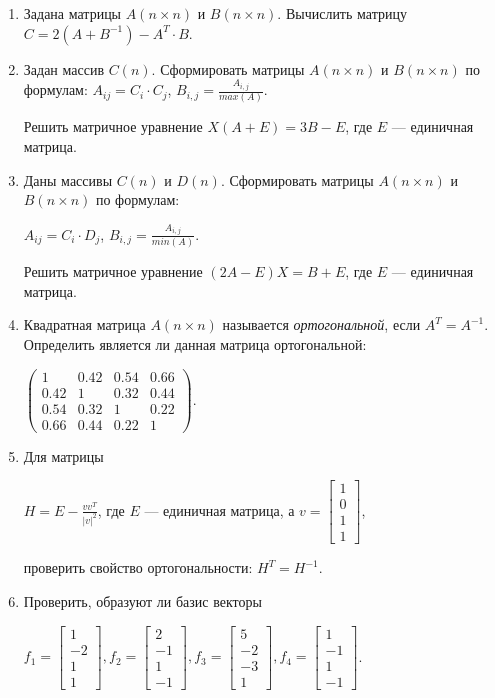 \begin{enumerate}
\item Задана матрицы $A(n\times n)$ и $B(n\times n)$. Вычислить матрицу 
$C=2(A+B^{-1})-A^T\cdot B$.
\item Задан массив $C(n)$. Сформировать матрицы $A(n\times n)$ и
$B(n\times n)$ по формулам:
 $A_{ij}=C_i\cdot C_j$,  $B_{i,j}=\frac{A_{i,j}}{max(A)}$.

Решить матричное уравнение  $X(A+E)=3B-E$, где $E$ --- единичная матрица.
\item Даны массивы $C(n)$ и $D(n)$. Сформировать матрицы
$A(n\times n)$ и $B(n\times n)$ по формулам:

$A_{ij}=C_i\cdot D_j$,  $B_{i,j}=\frac{A_{i,j}}{min(A)}$.

Решить матричное уравнение  $(2A-E)X=B+E$, где $E$ --- единичная матрица.
\item  Квадратная матрица $A(n\times n)$ называется \emph{ортогональной}, если 
$A^T=A^{-1}$. Определить является ли данная матрица ортогональной:

 $\left(\begin{matrix}1&0.42&0.54&0.66\\0.42&1&0.32&0.44\\0.54&0.32&1&0.22\\0.66&0.44&0.22&1\end{matrix}\right)$.
\item  Для матрицы

  $H=E-\displaystyle\frac{vv^T}{\left|v\right|^2}$, где $E$ --- единичная матрица, 
а $v=\left[\begin{matrix}1\\0\\1\\1\end{matrix}\right]$,

проверить свойство ортогональности:  $H^T=H^{-1}$. 
\item Проверить, образуют ли базис векторы 

$f_1=\left[\begin{matrix}1\\-2\\1\\1\end{matrix}\right], f_2=\left[\begin{matrix}2\\-1\\1\\-1\end{matrix}\right], f_3=\left[\begin{matrix}5\\-2\\-3\\1\end{matrix}\right], f_4=\left[\begin{matrix}1\\-1\\1\\-1\end{matrix}\right]$. 


\end{enumerate}
